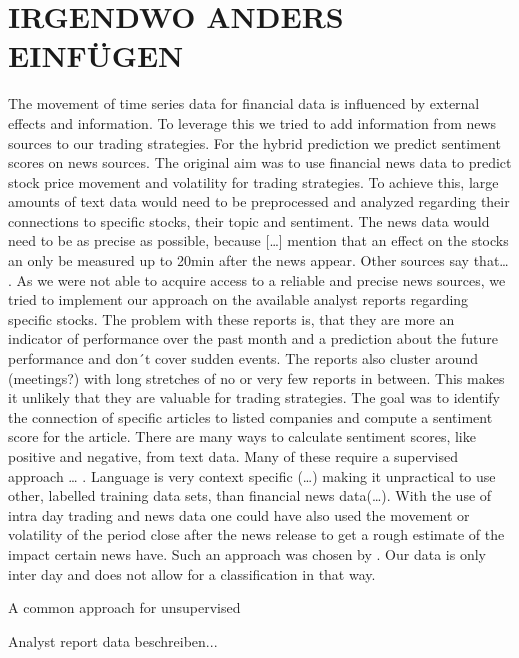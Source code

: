 \section{IRGENDWO ANDERS EINFÜGEN}
The movement of time series data for financial data is influenced by external effects and information. To leverage this we tried to add information from news sources to our trading strategies. For the hybrid prediction we predict sentiment scores on news sources. The original aim was to use financial news data to predict stock price movement and volatility for trading strategies. To achieve this, large amounts of text data would need to be preprocessed and analyzed regarding their connections to specific stocks, their topic and sentiment. The news data would need to be as precise as possible, because […] mention that an effect on the stocks an only be measured up to 20min after the news appear. Other sources say that… .
%
As we were not able to acquire access to a reliable and precise news sources, we tried to implement our approach on the available analyst reports regarding specific stocks. The problem with these reports is, that they are more an indicator of performance over the past month and a prediction about the future performance and don´t cover sudden events. The reports also cluster around (meetings?) with long stretches of no or very few reports in between. This makes it unlikely that they are valuable for trading strategies.
%
The goal was to identify the connection of specific articles to listed companies and compute a sentiment score for the article. There are many ways to calculate sentiment scores, like positive and negative, from text data. Many of these require a supervised approach … . Language is very context specific (…) making it unpractical to use other, labelled training data sets, than financial news data(…). With the use of intra day trading and news data one could have also used the movement or volatility of the period close after the news release to get a rough estimate of the impact certain news have. Such an approach was chosen by \citet{robertson2007news}. Our data is only inter day and does not allow for a classification in that way. 

A common approach for unsupervised 


Analyst report data beschreiben...

